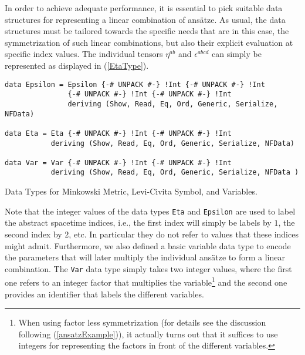In order to achieve adequate performance, it is essential to pick suitable data structures for representing a linear combination of ansätze. As usual, the data structures must be tailored towards the specific needs that are in this case, the symmetrization of such linear combinations, but also their explicit evaluation at specific index values.  
The individual tensors $\eta^{ab}$ and $\epsilon^{abcd}$ can simply be represented as displayed in (\ref{EtaType}).
\begin{listing}[hbt!] 
\begin{verbatim}
data Epsilon = Epsilon {-# UNPACK #-} !Int {-# UNPACK #-} !Int
               {-# UNPACK #-} !Int {-# UNPACK #-} !Int
               deriving (Show, Read, Eq, Ord, Generic, Serialize, NFData)

data Eta = Eta {-# UNPACK #-} !Int {-# UNPACK #-} !Int 
           deriving (Show, Read, Eq, Ord, Generic, Serialize, NFData)

data Var = Var {-# UNPACK #-} !Int {-# UNPACK #-} !Int 
           deriving (Show, Read, Eq, Ord, Generic, Serialize, NFData )
\end{verbatim} 
\caption{Data Types for Minkowski Metric, Levi-Civita Symbol, and Variables.}\label{EtaType}
\end{listing}
Note that the integer values of the data types \texttt{Eta} and \texttt{Epsilon} are used to label the abstract spacetime indices, i.e., the first index will simply be labels by $1$, the second index by $2$, etc. In particular they do not refer to values that these indices might admit.
Furthermore, we also defined a basic variable data type to encode the parameters that will later multiply the individual ansätze to form a linear combination. The \texttt{Var}
data type simply takes two integer values, where the first one refers to an integer factor that multiplies the variable\footnote{When using factor less symmetrization (for details see the discussion following (\ref{ansatzExample})), it actually turns out that it suffices to use integers for representing the factors in front of the different variables.} and the second one provides an identifier that labels the different variables. 

